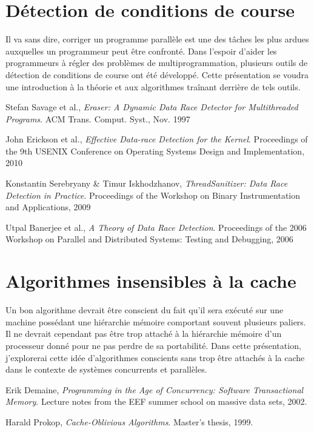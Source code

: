 \documentclass{article}
\begin{document}
\section*{Détection de conditions de course}
Il va sans dire, corriger un programme parallèle est une des tâches les plus ardues auxquelles un programmeur peut être confronté. Dans l'espoir d'aider les programmeurs à régler des problèmes de multiprogrammation, plusieurs outils de détection de conditions de course ont été développé. Cette présentation se voudra une introduction à la théorie et aux algorithmes traînant derrière de tels outils.
\renewcommand\refname{Références TSan}
\begin{thebibliography}{9}
          Stefan Savage et al.,
          \emph{Eraser: A Dynamic Data Race Detector for Multithreaded Programs}.
          ACM Trans. Comput. Syst., Nov. 1997
          
          John Erickson et al.,
          \emph{Effective Data-race Detection for the Kernel}.
          Proceedings of the 9th USENIX Conference on Operating Systems Design and Implementation, 2010
          
          Konstantin Serebryany \& Timur Iskhodzhanov,
          \emph{ThreadSanitizer: Data Race Detection in Practice}.
          Proceedings of the Workshop on Binary Instrumentation and Applications, 2009
          
          Utpal Banerjee et al.,
          \emph{A Theory of Data Race Detection}.
          Proceedings of the 2006 Workshop on Parallel and Distributed Systems: Testing and Debugging, 2006
         
\end{thebibliography}

\newpage

\section*{Algorithmes insensibles à la cache}
Un bon algorithme devrait être conscient du fait qu'il sera exécuté sur une machine possédant une hiérarchie mémoire comportant souvent plusieurs paliers. Il ne devrait cependant pas être trop attaché à la hiérarchie mémoire d'un processeur donné pour ne pas perdre de sa portabilité. Dans cette présentation, j'explorerai cette idée d'algorithmes conscients sans trop être attachés à la cache dans le contexte de systèmes concurrents et parallèles.
\renewcommand\refname{Références cache}
\begin{thebibliography}{9}
          Erik Demaine,
          \emph{Programming in the Age of Concurrency: Software Transactional Memory}.
          Lecture notes from the EEF summer school on massive data sets, 2002.
          
          Harald Prokop,
          \emph{Cache-Oblivious Algorithms}.
          Master's thesis, 1999.
         
\end{thebibliography}
\end{document}
